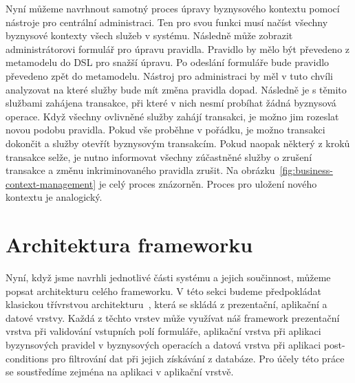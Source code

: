 Nyní můžeme navrhnout samotný proces úpravy byznysového kontextu pomocí nástroje pro
centrální administraci. Ten pro svou funkci musí načíst všechny byznysové kontexty všech
služeb v systému. Následně může zobrazit administrátorovi formulář pro úpravu pravidla.
Pravidlo by mělo být převedeno z metamodelu do \gls{DSL} pro snažší úpravu.
Po odeslání formuláře bude pravidlo převedeno zpět do metamodelu.
Nástroj pro administraci by měl v tuto chvíli analyzovat na které služby bude
mít změna pravidla dopad. Následně je s těmito službami zahájena transakce, při které v nich
nesmí probíhat žádná byznysová operace. Když všechny ovlivněné služby zahájí transakci, je možno
jim rozeslat novou podobu pravidla. Pokud vše proběhne v pořádku, je možno transakci dokončit
a služby otevřít byznysovým transakcím. Pokud naopak některý z kroků transakce selže, je nutno
informovat všechny zúčastněné služby o zrušení transakce a změnu inkriminovaného pravidla zrušit.
Na obrázku~\ref{fig:business-context-management} je celý proces znázorněn. Proces pro uložení nového kontextu je analogický.

\section{Architektura frameworku}\label{sec:architecture}

Nyní, když jsme navrhli jednotlivé části systému a jejich součinnost, můžeme popsat
architekturu celého frameworku. V této sekci budeme předpokládat klasickou třívrstvou
architekturu~\cite{fowler2002patterns}, která se skládá z prezentační, aplikační a datové vrstvy.
Každá z těchto vrstev může využívat náš framework \textendash\xspace prezentační vrstva
při validování vstupních polí formuláře, aplikační vrstva při aplikaci byzynsových pravidel
v byznysových operacích a datová vrstva při aplikaci post-conditions pro filtrování dat
při jejich získávání z databáze. Pro účely této práce se soustředíme zejména na aplikaci
v aplikační vrstvě.

